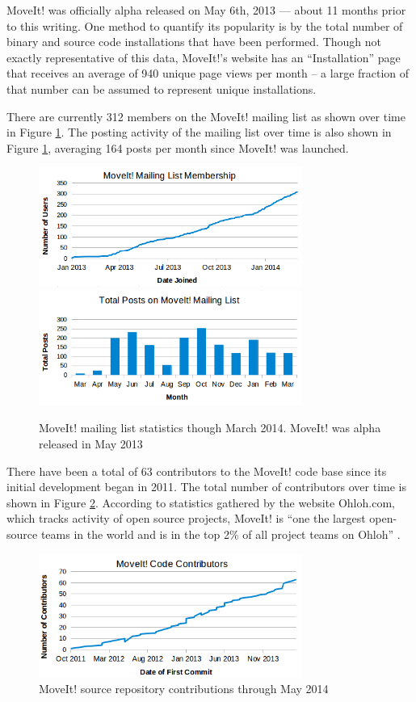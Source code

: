 \documentclass[10pt,journal,compsoc]{joser1}
\begin{document}
{MoveIt! was officially alpha released on May 6th, 2013 --- about 11 months
prior to this writing. One method to quantify its popularity is by the total
number of binary and source code installations that have been performed. Though
not exactly representative of this data, MoveIt!'s website has an
``Installation'' page that receives an average of 940 unique page views per month
\cite{moveit} -- a large fraction of that number can be assumed to represent
unique installations. 

There are currently 312 members on the MoveIt! mailing list as shown over time in
Figure \ref{fig:membership_plot}. The posting activity of the mailing list over
time is also shown in Figure \ref{fig:membership_plot}, averaging 164 posts per
month since MoveIt! was launched.

\begin{figure}[!t]
\centering
\includegraphics[width=3.4in]{coleman_20131110_f11}
\includegraphics[width=3.4in]{coleman_20131110_f12}
\caption{MoveIt! mailing list statistics though March 2014. MoveIt! was alpha released in May 2013}
\label{fig:membership_plot}
\end{figure}

There have been a total of 63 contributors to the MoveIt! code base since its
initial development began in 2011. The total number of contributors over time is
shown in Figure \ref{fig:contributors}. According to statistics gathered by the
website Ohloh.com, which tracks activity of open source projects, MoveIt! is
``one the largest open-source teams in the world and is in the top 2\% of all
project teams on Ohloh'' \cite{ohloh}.

\begin{figure}[!t]
\centering
\includegraphics[width=3.4in]{coleman_20131110_f13}
\caption{MoveIt! source repository contributions through May 2014}
\label{fig:contributors}
\end{figure}

}
\end{document}
